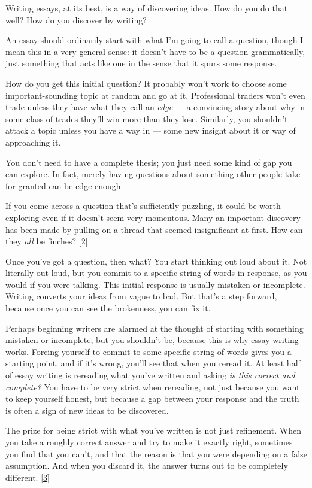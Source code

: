 Writing essays, at its best, is a way of discovering ideas. How do you
do that well? How do you discover by writing?

An essay should ordinarily start with what I'm going to call a question,
though I mean this in a very general sense: it doesn't have to be a
question grammatically, just something that acts like one in the sense
that it spurs some response.

How do you get this initial question? It probably won't work to choose
some important-sounding topic at random and go at it. Professional
traders won't even trade unless they have what they call an \emph{edge}
--- a convincing story about why in some class of trades they'll win
more than they lose. Similarly, you shouldn't attack a topic unless you
have a way in --- some new insight about it or way of approaching it.

You don't need to have a complete thesis; you just need some kind of gap
you can explore. In fact, merely having questions about something other
people take for granted can be edge enough.

If you come across a question that's sufficiently puzzling, it could be
worth exploring even if it doesn't seem very momentous. Many an
important discovery has been made by pulling on a thread that seemed
insignificant at first. How can they \emph{all} be finches?
{[}\hyperref[f2n]{2}{]}

Once you've got a question, then what? You start thinking out loud about
it. Not literally out loud, but you commit to a specific string of words
in response, as you would if you were talking. This initial response is
usually mistaken or incomplete. Writing converts your ideas from vague
to bad. But that's a step forward, because once you can see the
brokenness, you can fix it.

Perhaps beginning writers are alarmed at the thought of starting with
something mistaken or incomplete, but you shouldn't be, because this is
why essay writing works. Forcing yourself to commit to some specific
string of words gives you a starting point, and if it's wrong, you'll
see that when you reread it. At least half of essay writing is rereading
what you've written and asking \emph{is this correct and complete?} You
have to be very strict when rereading, not just because you want to keep
yourself honest, but because a gap between your response and the truth
is often a sign of new ideas to be discovered.

The prize for being strict with what you've written is not just
refinement. When you take a roughly correct answer and try to make it
exactly right, sometimes you find that you can't, and that the reason is
that you were depending on a false assumption. And when you discard it,
the answer turns out to be completely different. {[}\hyperref[f3n]{3}{]}

